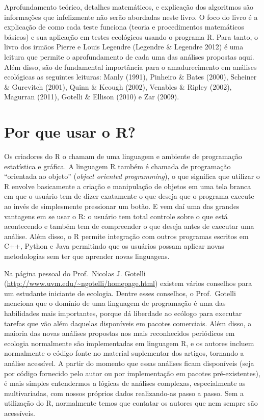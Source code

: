 \documentclass[
]{book}
\begin{document}
Aprofundamento teórico, detalhes matemáticos, e explicação dos algoritmos são informações que infelizmente não serão abordadas neste livro. O foco do livro é a explicação de como cada teste funciona (teoria e procedimentos matemáticos básicos) e sua aplicação em testes ecológicos usando o programa R. Para tanto, o livro dos irmãos Pierre e Louis Legendre (Legendre \& Legendre 2012) é uma leitura que permite o aprofundamento de cada uma das análises propostas aqui. Além disso, são de fundamental importância para o amadurecimento em análises ecológicas as seguintes leituras: Manly (1991), Pinheiro \& Bates (2000), Scheiner \& Gurevitch (2001), Quinn \& Keough (2002), Venables \& Ripley (2002), Magurran (2011), Gotelli \& Ellison (2010) e Zar (2009).

\hypertarget{por-que-usar-o-r}{%
\section{Por que usar o R?}\label{por-que-usar-o-r}}

Os criadores do R o chamam de uma linguagem e ambiente de programação estatística e gráfica. A linguagem R também é chamada de programação ``orientada ao objeto'' (\emph{object oriented programming}), o que significa que utilizar o R envolve basicamente a criação e manipulação de objetos em uma tela branca em que o usuário tem de dizer exatamente o que deseja que o programa execute ao invés de simplesmente pressionar um botão. E vem daí uma das grandes vantagens em se usar o R: o usuário tem total controle sobre o que está acontecendo e também tem de compreender o que deseja antes de executar uma análise. Além disso, o R permite integração com outros programas escritos em C++, Python e Java permitindo que os usuários possam aplicar novas metodologias sem ter que aprender novas linguagens.

Na página pessoal do Prof.~Nicolas J. Gotelli (\url{http://www.uvm.edu/~ngotelli/homepage.html}) existem vários conselhos para um estudante iniciante de ecologia. Dentre esses conselhos, o Prof.~Gotelli menciona que o domínio de uma linguagem de programação é uma das habilidades mais importantes, porque dá liberdade ao ecólogo para executar tarefas que vão além daquelas disponíveis em pacotes comerciais. Além disso, a maioria das novas análises propostas nos mais reconhecidos periódicos em ecologia normalmente são implementadas em linguagem R, e os autores incluem normalmente o código fonte no material suplementar dos artigos, tornando a análise acessível. A partir do momento que essas análises ficam disponíveis (seja por código fornecido pelo autor ou por implementação em pacotes pré-existentes), é mais simples entendermos a lógicas de análises complexas, especialmente as multivariadas, com nossos próprios dados realizando-as passo a passo. Sem a utilização do R, normalmente temos que contatar os autores que nem sempre são acessíveis.
\end{document}
